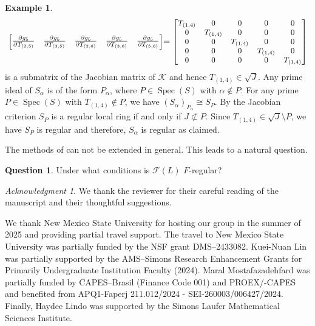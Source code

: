 \documentclass[11pt,a4paper,reqno,dvipsnames]{amsart}
\theoremstyle{plain}
\theoremstyle{definition}
\newtheorem{Assumptions and Discussion}[Theorem]{Assumptions and Discussion}
\newtheorem{Example}[Theorem]{Example}
\newtheorem{Question}[Theorem]{Question}
\theoremstyle{remark}
\newtheorem*{acknowledgment*}{Acknowledgment}
\newcommand\calF{\mathcal{F}}
\newcommand\calK{\mathcal{K}}
\newcommand\Spec{\operatorname{Spec}}
\begin{document}
\begin{Example}
$${\begin{bmatrix}
    \frac{\partial g_5}{\partial T_{(2,5)}}        & \frac{\partial g_5}{\partial T_{(3,5)}}      & \frac{\partial g_5}{\partial T_{(2,6)}}        & \frac{\partial g_5}{\partial T_{(3,6)}}        & \frac{\partial g_5}{\partial T_{(5,6)}}\\
\end{bmatrix}}\small{=\begin{bmatrix}
    T_{(1,4)} &     0   &   0     &    0    &    0    \\
    0        & T_{(1,4)} &   0     &    0    &    0    \\
    0        & 0        & T_{(1,4)} &    0    &   0     \\
    0        & 0        & 0        & T_{(1,4)} &   0     \\
    0        & 0        & 0        & 0        & T_{(1,4)}\\

\end{bmatrix}}$$
is a submatrix of the Jacobian matrix of $\calK$ and hence $T_{(1,4)}\in \sqrt{J}$. Any prime ideal of $S_{\alpha}$ is of the form $P_{\alpha}$, where $P\in \Spec(S)$ with $\alpha\not \in P$. For any prime $P\in \Spec(S)$ with $T_{(1,4)}\not\in P$, we have $(S_{\alpha})_{P_{\alpha}}\cong S_{P}$.  By the Jacobian criterion \cite[Corollary 16.20]{EiComm} $S_{P}$ is a regular local ring if and only if $J\not \subset P$. Since $T_{(1,4)}\in \sqrt{J} \setminus P$, we have $S_{P}$ is regular and therefore, $S_{\alpha}$ is regular as claimed.
\end{Example}

The methods of  can not be extended in general. This leads to a natural question.
\begin{Question}
     Under what conditions is $\calF(L)$ $F$-regular?
\end{Question}

\vspace{0.5cm}

\begin{acknowledgment*}
We thank the reviewer for their careful reading of the manuscript and their thoughtful suggestions.

We thank New Mexico State University for hosting our group in the summer of 2025 and providing partial travel support. The travel to New Mexico State University was partially funded by the NSF grant DMS–2433082.
Kuei-Nuan Lin was partially supported by the AMS–Simons Research Enhancement Grants for Primarily Undergraduate Institution Faculty (2024).
Maral Mostafazadehfard was partially funded by CAPES–Brasil (Finance Code 001) and PROEX/-CAPES and benefited from APQ1-Faperj 211.012/2024 - SEI-260003/006427/2024.
Finally, Haydee Lindo was supported by the Simons Laufer Mathematical Sciences Institute.
\end{acknowledgment*}





\end{document}
